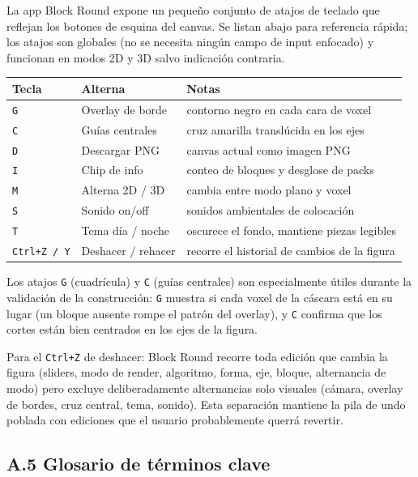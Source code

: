 \documentclass[12pt,a4paper]{scrartcl}
\newcommand{\code}[1]{\texttt{\small #1}}
\begin{document}
La app Block Round expone un pequeño conjunto de atajos de teclado que reflejan los botones de esquina del canvas. Se listan abajo para referencia rápida; los atajos son globales (no se necesita ningún campo de input enfocado) y funcionan en modos 2D y 3D salvo indicación contraria.

\vspace{0.4em}
\begin{center}
\begin{tabular}{@{}lll@{}}
\toprule
\textbf{Tecla} & \textbf{Alterna} & \textbf{Notas} \\
\midrule
\code{G} & Overlay de borde  & contorno negro en cada cara de voxel \\
\code{C} & Guías centrales  & cruz amarilla translúcida en los ejes \\
\code{D} & Descargar PNG  & canvas actual como imagen PNG \\
\code{I} & Chip de info  & conteo de bloques y desglose de packs \\
\code{M} & Alterna 2D / 3D  & cambia entre modo plano y voxel \\
\code{S} & Sonido on/off  & sonidos ambientales de colocación \\
\code{T} & Tema día / noche  & oscurece el fondo, mantiene piezas legibles \\
\code{Ctrl+Z / Y} & Deshacer / rehacer  & recorre el historial de cambios de la figura \\
\bottomrule
\end{tabular}
\end{center}

Los atajos \code{G} (cuadrícula) y \code{C} (guías centrales) son especialmente útiles durante la validación de la construcción: \code{G} muestra si cada voxel de la cáscara está en su lugar (un bloque ausente rompe el patrón del overlay), y \code{C} confirma que los cortes están bien centrados en los ejes de la figura.

Para el \code{Ctrl+Z} de deshacer: Block Round recorre toda edición que cambia la figura (sliders, modo de render, algoritmo, forma, eje, bloque, alternancia de modo) pero excluye deliberadamente alternancias solo visuales (cámara, overlay de bordes, cruz central, tema, sonido). Esta separación mantiene la pila de undo poblada con ediciones que el usuario probablemente querrá revertir.

\subsection*{A.5 Glosario de términos clave}
\end{document}
